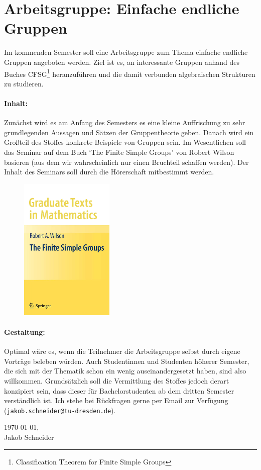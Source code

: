 \documentclass{article}
\begin{document}
\section*{Arbeitsgruppe: Einfache endliche Gruppen}

Im kommenden Semester soll eine Arbeitsgruppe zum Thema einfache endliche Gruppen angeboten werden. Ziel ist es, an interessante Gruppen anhand des Buches CFSG\footnote{Classification Theorem for Finite Simple Groups} heranzuführen und die damit verbunden algebraischen Strukturen zu studieren.

\paragraph{Inhalt:}
Zunächst wird es am Anfang des Semesters es eine kleine Auffrischung zu sehr grundlegenden Aussagen und Sätzen der Gruppentheorie geben.
Danach wird ein Großteil des Stoffes konkrete Beispiele von Gruppen sein. Im Wesentlichen soll das Seminar auf dem Buch `The Finite Simple Groups' von Robert Wilson
basieren (aus dem wir wahrscheinlich nur einen Bruchteil schaffen werden). Der Inhalt des Seminars soll durch die Hörerschaft mitbestimmt werden.

\begin{figure}[htb]
    \centering
    \includegraphics[width=0.4\textwidth]{FSG.jpg}
\end{figure}

\paragraph{Gestaltung:} Optimal wäre es, wenn die Teilnehmer die Arbeitsgruppe selbst durch eigene Vorträge beleben würden.
Auch Studentinnen und Studenten höherer Semester, die sich mit der Thematik schon ein wenig auseinandergesetzt haben, sind also willkommen.
Grundsätzlich soll die Vermittlung des Stoffes jedoch derart konzipiert sein, dass dieser für Bachelorstudenten ab dem dritten Semester verständlich ist.
Ich stehe bei Rückfragen gerne per Email zur Verfügung ({\tt jakob.schneider@tu-dresden.de}).


\begin{flushright}
    \today,\\
    Jakob Schneider  
\end{flushright}
\end{document}
